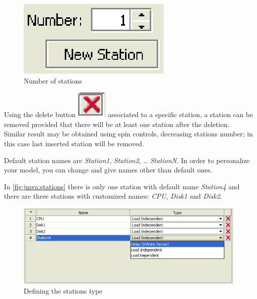 \begin{figure}[htbp]
    \begin{center}
        \includegraphics[scale=.5]{img/jmva/stationNum}
    \end{center}
    \caption{Number of stations}
    \label{fig:jmva:stationNum}
\end{figure}

Using the delete button
\includegraphics[scale=.6]{img/jmva/x} associated to a specific
station, a station can be removed provided that there will be at
least one station after the deletion. Similar result may be obtained
using spin controls, decreasing stations number; in this case last
inserted station will be removed.

Default station names are \emph{Station1}, \emph{Station2}, \dots
\emph{StationN}. In order to personalize your model, you can change
and give names other than default ones.

In \autoref{fig:jmva:stations} there is only one station with
default name \emph{Station4} and there are three stations with
customized names: \emph{CPU}, \emph{Disk1} and \emph{Disk2}.

\begin{figure}[htbp]
    \begin{center}
        \includegraphics[scale=.5]{img/jmva/4stations}
    \end{center}
    \caption{Defining the stations type}
    \label{fig:jmva:stations}
\end{figure}

